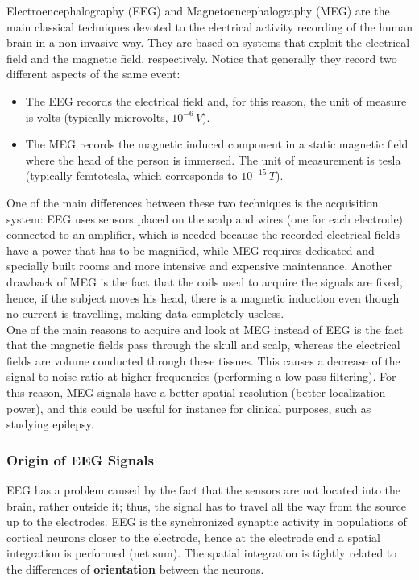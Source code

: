 Electroencephalography (EEG) and Magnetoencephalography (MEG) are the main classical
techniques devoted to the electrical activity recording of the human brain in a non-invasive
way. They are based on systems that exploit the electrical field and the magnetic field,
respectively. Notice that generally they record two different aspects of the same event:
\begin{itemize}
    \item The EEG records the electrical field and, for this reason, the unit of measure
          is volts (typically
          microvolts, \(10^{-6}\,V\)).
    \item The MEG records the magnetic induced component in a static magnetic field where
          the head of the person is immersed. The unit of measurement is tesla (typically
          femtotesla, which corresponds to \(10^{-15}\,T\)).
\end{itemize}
One of the main differences between these two techniques is the acquisition system: EEG
uses sensors placed on the scalp and wires (one for each electrode) connected to an amplifier,
which is needed because the recorded electrical fields have a power that has to be magnified,
while MEG requires dedicated and specially built rooms and more intensive and expensive
maintenance. Another drawback of MEG is the fact that the coils used to acquire the signals
are fixed, hence, if the subject moves his head, there is a magnetic induction even though
no current is travelling, making data completely useless.\\

One of the main reasons to acquire and look at MEG instead of EEG is the fact that the
magnetic fields pass through the skull and scalp, whereas the electrical fields are volume
conducted through these tissues. This causes a decrease of the signal-to-noise ratio at
higher frequencies (performing a low-pass filtering). For this reason, MEG signals have a
better spatial resolution (better localization power), and this could be useful for instance
for clinical purposes, such as studying epilepsy.
\subsubsection{Origin of EEG Signals}
EEG has a problem caused by the fact that the sensors are not located into the brain, rather
outside it; thus, the signal has to travel all the way from the source up to the
electrodes. EEG is the synchronized synaptic activity in populations of cortical neurons
closer to the electrode, hence at the electrode end a spatial integration is performed (net
sum). The spatial integration is tightly related to the differences of \textbf{orientation}
between the neurons.\\

